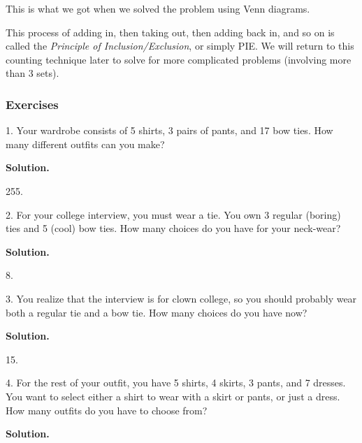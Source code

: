 \documentclass[10pt,]{book}
\theoremstyle{plain}
\theoremstyle{definition}
\theoremstyle{definition}
\theoremstyle{definition}
\numberwithin{equation}{section}
\begin{document}
This is what we got when we solved the problem using Venn diagrams.
%
\par

This process of adding in, then taking out, then adding back in, and so on is called the \emph{Principle of Inclusion/Exclusion}, or simply PIE. We will return to this counting technique later to solve for more complicated problems (involving more than 3 sets).
%
\typeout{************************************************}
\typeout{************************************************}
\subsubsection[Exercises]{Exercises}\label{exercises-4}
\begin{exerciselist}
\item[1.]\hypertarget{exercise-42}{}
Your wardrobe consists of 5 shirts, 3 pairs of pants, and 17 bow ties. How many different outfits can you make?
%
\par\smallskip
\par\smallskip
\noindent\textbf{Solution.}\hypertarget{solution-65}{}\quad

255.
%
\item[2.]\hypertarget{exercise-43}{}
For your college interview, you must wear a tie. You own 3 regular (boring) ties and 5 (cool) bow ties. How many choices do you have for your neck-wear?
%
\par\smallskip
\par\smallskip
\noindent\textbf{Solution.}\hypertarget{solution-66}{}\quad

8.
%
\item[3.]\hypertarget{exercise-44}{}
You realize that the interview is for clown college, so you should probably wear both a regular tie and a bow tie. How many choices do you have now?
%
\par\smallskip
\par\smallskip
\noindent\textbf{Solution.}\hypertarget{solution-67}{}\quad

15.
%
\item[4.]\hypertarget{exercise-45}{}
For the rest of your outfit, you have 5 shirts, 4 skirts, 3 pants, and 7 dresses. You want to select either a shirt to wear with a skirt or pants, or just a dress. How many outfits do you have to choose from?
%
\par\smallskip
\par\smallskip
\noindent\textbf{Solution.}\hypertarget{solution-68}{}\quad


\end{exerciselist}
\end{document}
